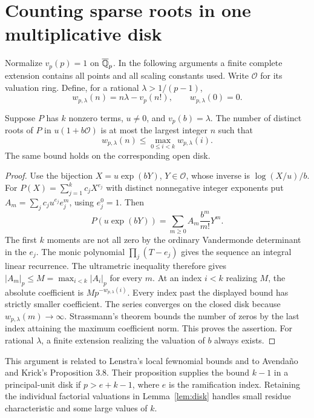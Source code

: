 \section{Counting sparse roots in one multiplicative disk}\label{sec:local}
Normalize $v_p(p)=1$ on $\overline{\mathbb Q}_p$. In the following arguments a finite complete extension contains all points and all scaling constants used. Write $\mathcal O$ for its valuation ring. Define, for a rational $\lambda>1/(p-1)$,
\[
 w_{p,\lambda}(n)=n\lambda-v_p(n!),\qquad w_{p,\lambda}(0)=0.
\]
\begin{lemma}\label{lem:disk}
Suppose $P$ has $k$ nonzero terms, $u\ne0$, and $v_p(b)=\lambda$. The number of distinct roots of $P$ in $u(1+b\mathcal O)$ is at most the largest integer $n$ such that
\[
 w_{p,\lambda}(n)\le\max_{0\le i<k}w_{p,\lambda}(i).
\]
The same bound holds on the corresponding open disk.
\end{lemma}
\begin{proof}
Use the bijection $X=u\exp(bY)$, $Y\in\mathcal O$, whose inverse is $\log(X/u)/b$. For $P(X)=\sum_{j=1}^k c_jX^{e_j}$ with distinct nonnegative integer exponents put $A_m=\sum_j c_j u^{e_j}e_j^m$, using $e_j^0=1$. Then
\[
 P(u\exp(bY))=\sum_{m\ge0} A_m\frac{b^m}{m!}Y^m.
\]
The first $k$ moments are not all zero by the ordinary Vandermonde determinant in the $e_j$. The monic polynomial $\prod_j(T-e_j)$ gives the sequence an integral linear recurrence. The ultrametric inequality therefore gives $|A_m|_p\le M=\max_{i<k}|A_i|_p$ for every $m$. At an index $i<k$ realizing $M$, the absolute coefficient is $M p^{-w_{p,\lambda}(i)}$. Every index past the displayed bound has strictly smaller coefficient. The series converges on the closed disk because $w_{p,\lambda}(m)\to\infty$. Strassmann's theorem bounds the number of zeros by the last index attaining the maximum coefficient norm. This proves the assertion. For rational $\lambda$, a finite extension realizing the valuation of $b$ always exists.
\end{proof}

This argument is related to Lenstra's local fewnomial bounds and to Avenda\~no and Krick's Proposition 3.8. Their proposition supplies the bound $k-1$ in a principal-unit disk if $p>e+k-1$, where $e$ is the ramification index. Retaining the individual factorial valuations in Lemma~\ref{lem:disk} handles small residue characteristic and some large values of $k$.\cite{aven}

